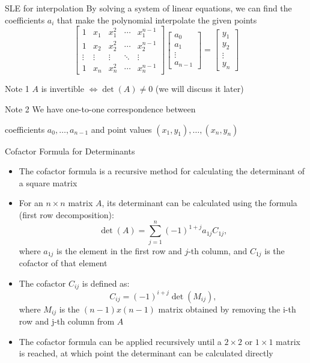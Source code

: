 \documentclass[fullscreen=true, bookmarks=true, hyperref={pdfencoding=unicode}]{beamer}
\begin{document}
\begin{frame}{SLE for interpolation}
  By solving a system of linear equations, 
  we can find the coefficients $a_i$ that make the polynomial 
  interpolate the given points
\[
  \begin{bmatrix}
    1      & x_1    & x_1^2  & \cdots & x_1^{n-1} \\
    1      & x_2    & x_2^2  & \cdots & x_2^{n-1} \\
    \vdots & \vdots & \vdots & \ddots & \vdots \\
    1      & x_n    & x_n^2  & \cdots & x_n^{n-1}
  \end{bmatrix}
  \begin{bmatrix}
    a_0 \\
    a_1 \\
    \vdots \\
    a_{n-1}
  \end{bmatrix} =
  \begin{bmatrix}
    y_1 \\
    y_2 \\
    \vdots \\
    y_n
  \end{bmatrix}
\]
\pause
\begin{block}{Note 1}
    $A$ is invertible $\iff \det(A) \neq 0$ (we will discuss it later)
\end{block}
\pause
\begin{block}{Note 2}
  We have one-to-one correspondence between

  coefficients $a_0, \hdots, a_{n-1}$ and point values $(x_1, y_1), \hdots, (x_n, y_n)$
\end{block}
\end{frame}


\begin{frame}{Cofactor Formula for Determinants}
  \begin{itemize}
    \item The cofactor formula is a recursive method for calculating the determinant of a square matrix
    \item For an $n \times n$ matrix $A$, its determinant can be calculated using the formula (first row decomposition):
      \[
      \det(A) = \sum_{j=1}^n (-1)^{1+j} a_{1j} C_{1j},
      \]
      where $a_{1j}$ is the element in the first row and $j$-th column, and $C_{1j}$ is the cofactor of that element
    \pause
    \item The cofactor $C_{ij}$ is defined as:
      \[
      C_{ij} = (-1)^{i+j} \det(M_{ij}),
      \]
      where $M_{ij}$ is the $(n-1) x (n-1)$ matrix obtained by removing the i-th row and j-th column from $A$
    \item The cofactor formula can be applied recursively until a $2 \times 2$ or 
    $1 \times 1$ matrix is reached, at which point the determinant 
    can be calculated directly
  \end{itemize}
\end{frame}
\end{document}
